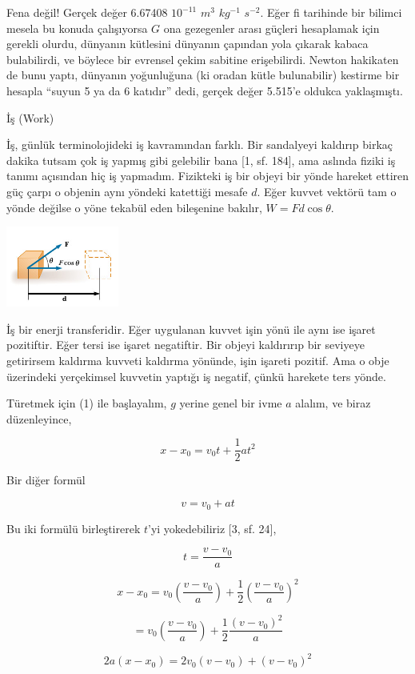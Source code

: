 \documentclass[12pt,fleqn]{article}\usepackage{../../common}
\begin{document}
Fena değil! Gerçek değer 6.67408 $10^{-11}$ $m^3$ $kg^{-1}$ $s^{-2}$. Eğer fi
tarihinde bir bilimci mesela bu konuda çalışıyorsa $G$ ona gezegenler arası
güçleri hesaplamak için gerekli olurdu, dünyanın kütlesini dünyanın çapından
yola çıkarak kabaca bulabilirdi, ve böylece bir evrensel çekim sabitine
erişebilirdi. Newton hakikaten de bunu yaptı, dünyanın yoğunluğuna (ki oradan
kütle bulunabilir) kestirme bir hesapla ``suyun 5 ya da 6 katıdır'' dedi, gerçek
değer 5.515'e oldukca yaklaşmıştı.

İş (Work)

İş, günlük terminolojideki iş kavramından farklı. Bir sandalyeyi kaldırıp birkaç
dakika tutsam çok iş yapmış gibi gelebilir bana [1, sf. 184], ama aslında fiziki
iş tanımı açısından hiç iş yapmadım. Fizikteki iş bir objeyi bir yönde hareket
ettiren güç çarpı o objenin aynı yöndeki katettiği mesafe $d$. Eğer kuvvet
vektörü tam o yönde değilse o yöne tekabül eden bileşenine bakılır, $W = F d
\cos\theta$.

\includegraphics[width=10em]{phy_005_basics_01_06.jpg}

İş bir enerji transferidir. Eğer uygulanan kuvvet işin yönü ile aynı
ise işaret pozitiftir. Eğer tersi ise işaret negatiftir. Bir objeyi
kaldırırıp bir seviyeye getirirsem kaldırma kuvveti kaldırma yönünde,
işin işareti pozitif. Ama o obje üzerindeki yerçekimsel kuvvetin
yaptığı iş negatif, çünkü harekete ters yönde. 

Türetmek için (1) ile başlayalım, $g$ yerine genel bir ivme $a$ alalım, ve
biraz düzenleyince,

$$
x - x_0 = v_0 t + \frac{1}{2} a t^2
$$

Bir diğer formül

$$
v = v_0 + a t
$$

Bu iki formülü birleştirerek $t$'yi yokedebiliriz [3, sf. 24], 

$$
t = \frac{v-v_0}{a}
$$

$$
x - x_0 = 
v_0 \left(\frac{v-v_0}{a}\right) + 
\frac{1}{2} \left(\frac{v-v_0}{a}\right)^2
$$

$$
= v_0 \left(\frac{v-v_0}{a}\right) + \frac{1}{2} \frac{(v-v_0)^2}{a}
$$

$$
2a (x-x_0) = 2 v_0 (v-v_0) + (v-v_0)^2
$$
\end{document}
